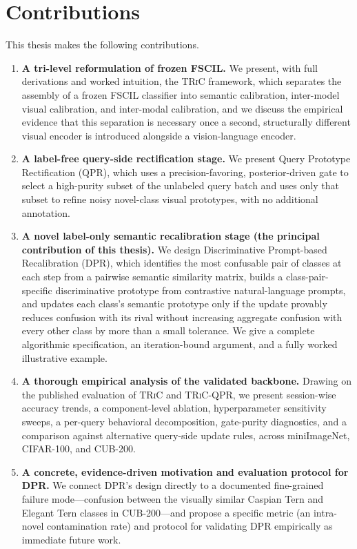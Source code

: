 \documentclass{iutbscthesis}
\begin{document}
\section{Contributions}
\label{sec:contributions}

This thesis makes the following contributions.

\begin{enumerate}
    \item \textbf{A tri-level reformulation of frozen FSCIL.} We present, with full derivations and worked intuition, the \textsc{TRiC} framework, which separates the assembly of a frozen FSCIL classifier into semantic calibration, inter-model visual calibration, and inter-modal calibration, and we discuss the empirical evidence that this separation is necessary once a second, structurally different visual encoder is introduced alongside a vision-language encoder.
    \item \textbf{A label-free query-side rectification stage.} We present Query Prototype Rectification (QPR), which uses a precision-favoring, posterior-driven gate to select a high-purity subset of the unlabeled query batch and uses only that subset to refine noisy novel-class visual prototypes, with no additional annotation.
    \item \textbf{A novel label-only semantic recalibration stage (the principal contribution of this thesis).} We design Discriminative Prompt-based Recalibration (DPR), which identifies the most confusable pair of classes at each step from a pairwise semantic similarity matrix, builds a class-pair-specific discriminative prototype from contrastive natural-language prompts, and updates each class's semantic prototype only if the update provably reduces confusion with its rival without increasing aggregate confusion with every other class by more than a small tolerance. We give a complete algorithmic specification, an iteration-bound argument, and a fully worked illustrative example.
    \item \textbf{A thorough empirical analysis of the validated backbone.} Drawing on the published evaluation of \textsc{TRiC} and \textsc{TRiC}-QPR, we present session-wise accuracy trends, a component-level ablation, hyperparameter sensitivity sweeps, a per-query behavioral decomposition, gate-purity diagnostics, and a comparison against alternative query-side update rules, across miniImageNet, CIFAR-100, and CUB-200.
    \item \textbf{A concrete, evidence-driven motivation and evaluation protocol for DPR.} We connect DPR's design directly to a documented fine-grained failure mode---confusion between the visually similar Caspian Tern and Elegant Tern classes in CUB-200---and propose a specific metric (an intra-novel contamination rate) and protocol for validating DPR empirically as immediate future work.
\end{enumerate}
\end{document}
